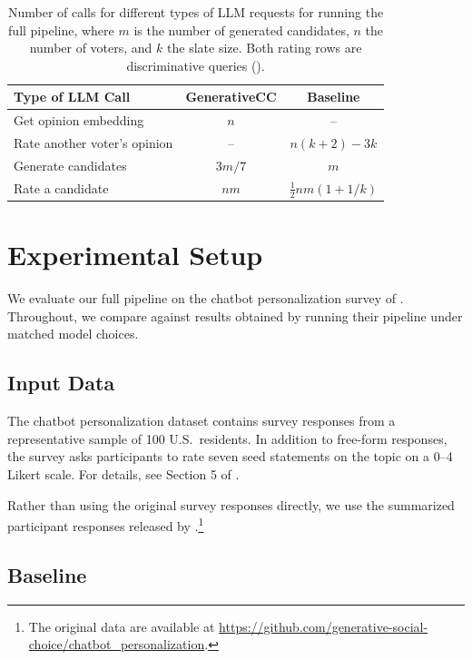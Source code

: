 \documentclass[letterpaper]{article} %
\begin{document}
\begin{table}[t]
\centering
{\small
\begin{tabular}{lcc}
\hline
Type of LLM Call & GenerativeCC & \makecell{Baseline \\ \citep{fish-v2}} \\
\hline
Get opinion embedding & $n$ & -- \\
Rate another voter's opinion & -- & $n(k+2) - 3k$ \\
Generate candidates & $3m/7$ & $m$ \\
Rate a candidate & $nm$ & $\frac{1}{2} n m (1 + 1/k)$ \\
\hline
\end{tabular}}
\caption{Number of calls for different types of LLM requests for running the full pipeline, where \(m\) is the number of generated candidates, \(n\) the number of voters, and \(k\) the slate size.
Both rating rows are discriminative queries ().}
\label{tab:llm-call-comparison}
\end{table}

\section{Experimental Setup}

We evaluate our full pipeline on the chatbot personalization survey of \citet{fish-v2}.
Throughout, we compare against results obtained by running their pipeline under matched model choices.

\subsection{Input Data}

The chatbot personalization dataset contains survey responses from a representative sample of 100 U.S.\ residents.
In addition to free-form responses, the survey asks participants to rate seven seed statements on the topic on a 0--4 Likert scale.
For details, see Section 5 of \citet{fish-v2}.

Rather than using the original survey responses directly, we use the summarized participant responses released by \citet{fish-v2}.\footnote{The original data are available at \url{https://github.com/generative-social-choice/chatbot_personalization}.}

\subsection{Baseline}
\end{document}
